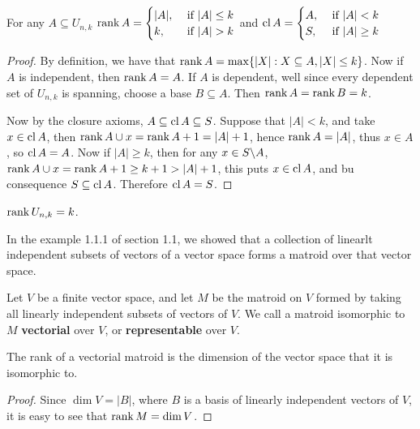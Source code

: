 \begin{corollary}
   For any $A \subseteq U_{n,k}$ $\rank{A}=\begin{cases}
                                        |A|, & \text{ if } |A| \leq k \\
                                        k, & \text{ if } |A|>k \\
                                    \end{cases}$
   and $\operatorname{cl}{A}=\begin{cases}
                    A, & \text{ if } |A|<k \\
                    S, & \text{ if } |A| \geq k \\
               \end{cases}$
\end{corollary}
\begin{proof}
    By definition, we have that $\operatorname{rank}{A}=\max\{|X|: X \subseteq A, |X|\leq k\}$. Now if $A$ is
    independent, then  $\operatorname{rank}{A}=A$. If $A$ is dependent, well since every dependent set of
    $U_{n,k}$ is spanning, choose a base $B \subseteq A$. Then  $\operatorname{rank}{A}=\operatorname{rank}{B}=k$.

    Now by the closure axioms,  $A \subseteq \operatorname{cl}{A} \subseteq S$. Suppose that $|A|<k$, and take  $x
    \in \operatorname{cl}{A}$, then $\operatorname{rank}{A \cup x}=\operatorname{rank}{A}+1=|A|+1$, hence $\operatorname{rank}{A}=|A|$, thus $x \in A$, so
$\operatorname{cl}{A}=A$. Now if $|A| \geq k$, then for any  $x \in S\backslash A$, $\operatorname{rank}{A \cup x}=\operatorname{rank}{A}+1 \geq
k+1>|A|+1$, this puts $x \in \operatorname{cl}{A}$, and bu consequence $S \subseteq \operatorname{cl}{A}$. Therefore $\operatorname{cl}{A}=S$.
\end{proof}
\begin{corollary}
    $\operatorname{rank}{U_{n,k}}=k$.
\end{corollary}

In the example 1.1.1 of section 1.1, we showed that a collection of linearlt independent subsets of
vectors of a vector space forms a matroid over that vector space.

\begin{definition}
    Let $V$ be a finite vector space, and let $M$ be the matroid on $V$ formed by taking all
    linearly independent subsets of vectors of $V$. We call a matroid isomorphic to $M$
    \textbf{vectorial} over $V$, or \textbf {representable} over $V$.
\end{definition}

\begin{proposition}\label{1.2.2}
    The rank of a vectorial matroid is the dimension of the vector space that it is isomorphic to.
\end{proposition}
\begin{proof}
    Since $\dim{V}=|B|$, where $B$ is a basis of linearly independent vectors of  $V$, it is easy to
    see that  $\operatorname{rank}{M}=\dim{V}$.
\end{proof}

